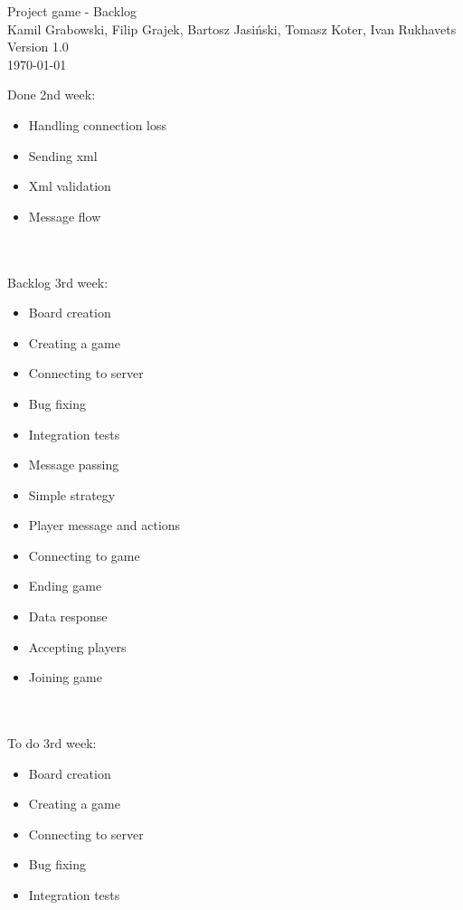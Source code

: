 \documentclass[11pt,a4paper]{article}
\begin{document}
\begin{titlepage}
\centering
\huge Project game - Backlog \\
\vspace{1.5cm}
\large Kamil Grabowski, Filip Grajek, Bartosz Jasiński, Tomasz Koter, Ivan Rukhavets \\
\vspace{1.0cm}
Version 1.0 \\
\vspace{1.0cm}
\today
\end{titlepage}

Done 2nd week:
\begin{itemize}

\item Handling connection loss
\item Sending xml
\item Xml validation
\item Message flow
\end{itemize}

\\~\\
Backlog 3rd week:
\begin{itemize}
\item Board creation
\item Creating a game
\item Connecting to server
\item Bug fixing
\item Integration tests
\item Message passing
\item Simple strategy
\item Player message and actions
\item Connecting to game
\item Ending game
\item Data response
\item Accepting players
\item Joining game
\end{itemize}

\\~\\
To do 3rd week:
\begin{itemize}
\item Board creation
\item Creating a game
\item Connecting to server
\item Bug fixing
\item Integration tests
\end{itemize}
 
\end{document}
